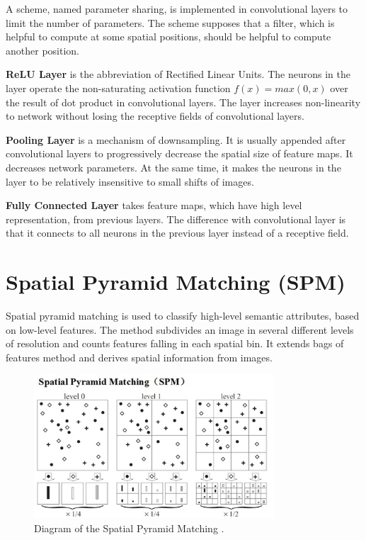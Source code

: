 A scheme, named parameter sharing, is implemented in convolutional layers to limit the number of parameters. The scheme supposes that a filter, which is helpful to compute at some spatial positions, should be helpful to compute another position.

\textbf{ReLU Layer} is the abbreviation of Rectified Linear Units. The neurons in the layer operate the non-saturating activation function $f(x) = max(0,x)$ over the result of dot product in convolutional layers. The layer increases non-linearity to network without losing the receptive fields of convolutional layers.

\textbf{Pooling Layer} is a mechanism of downsampling. It is usually appended after convolutional layers to progressively decrease the spatial size of feature maps. It decreases network parameters. At the same time, it makes the neurons in the layer to be relatively insensitive to small shifts of images.

\textbf{Fully Connected Layer} takes feature maps, which have high level representation, from previous layers. The difference with convolutional layer is that it connects to all neurons in the previous layer instead of a receptive field.

\section{Spatial Pyramid Matching (SPM)}

Spatial pyramid matching \citep{lazebnik2006beyond} is used to classify high-level semantic attributes, based on low-level features. The method subdivides an image in several different levels of resolution and counts features falling in each spatial bin. It extends bags of features method and derives spatial information from images.
\graphicspath{ {./Figures/} }
\begin{figure}[!htb]
\centering
\includegraphics[width=0.8\textwidth]{spm.jpg}
\caption{\label{fig:SpatialPyramidMatching}Diagram of the Spatial Pyramid Matching \citep{lazebnik2006beyond}.}
\end{figure}

